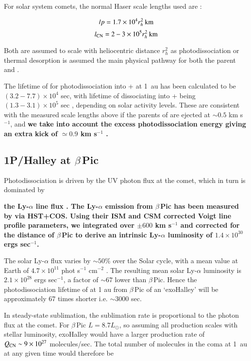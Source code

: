 \documentclass{aa}
\newcommand{\kms}{km s$^{-1}$}
\newcommand{\bp}{$\beta$\,Pic}
\begin{document}
For solar system comets, the normal Haser scale lengths used are \citep{Cochran86,AHearn1995} :

$$lp=1.7\times10^4r_h^2\:{\rm km}$$
$$l_{\ce{CN}}=2-3\times10^5r_h^2\:{\rm km}$$

Both are assumed to scale with heliocentric distance $r_h^2$ as photodissociation or thermal desorption is assumed the main physical pathway for both the parent and .

The lifetime of  for photodissociation into + at 1~au has been calculated to be $(3.2-7.7)\times10^4$ sec, with lifetime of  dissociating into + being $(1.3-3.1)\times10^5$ sec \citep{Huebner92}, depending on solar activity levels.
%
These are consistent with the measured scale lengths above if the parents of  are ejected at $\sim 0.5$ \kms{}, and {\bf 
we take into account the excess photodissociation energy giving  an extra kick of $\simeq0.9$ \kms{} \citep{Fray2005}. 
}
\subsection{1P/Halley at \texorpdfstring{\bp{}}{Beta Pictoris}}

Photodissociation is  driven by the UV photon flux at the comet, which in turn is dominated by {\bf the Ly-$\alpha$ line flux \citep{Combi80}.
%
The  Ly-$\alpha$ emission from \bp{} has been measured by \citet{Wilson17} via HST+COS. Using their ISM and CSM corrected Voigt line profile parameters, we integrated over $\pm600$ \kms{} and corrected for the distance of \bp{} to derive an intrinsic Ly-$\alpha$ luminosity of $1.4\times10^{30}$ ergs sec$^{-1}$.

The solar Ly-$\alpha$  flux varies by $\sim 50\% $ over the Solar cycle, with a mean value at Earth of $4.7\times10^{11}$ phot s$^{-1}$ cm$^{-2}$ \citep{Woods00}. The resulting mean solar Ly-$\alpha$ luminosity is $2.1\times10^{28}$ ergs sec$^{-1}$, a factor of $\sim 67$ lower than \bp{}.
%
Hence the photodissociation lifetime of   at 1 au from \bp{} of an `exoHalley' will be approximately 67 times shorter i.e. $\sim 3000$ sec.
}

In steady-state sublimation, the sublimation rate is proportional to the photon flux at the comet.
%
For \bp{} $L=8.7L_\odot$, so assuming all  production scales with stellar luminosity, exoHalley would have a larger  production rate of $Q_{\ce{CN}}\sim 9\times10^{27}$ molecules/sec.
%
The total number of  molecules in the coma at 1~au at any given time would therefore be
\end{document}
